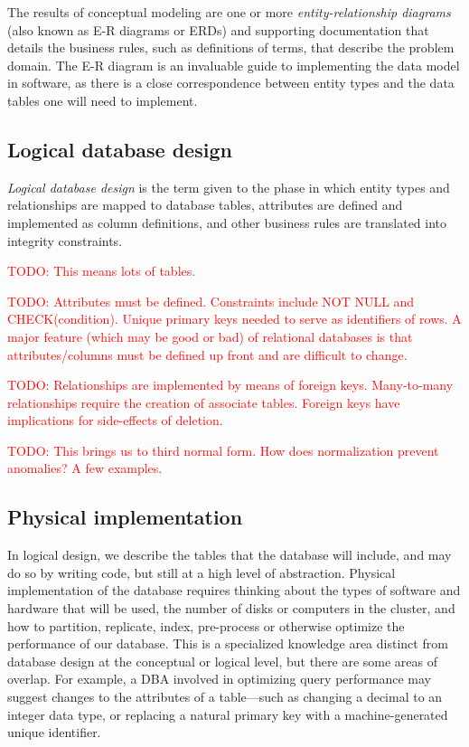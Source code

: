 \documentclass[11pt]{book}
\newcommand{\term}[1]{\emph{#1}} %
\newcommand{\todo}[1]{\textcolor{red}{TODO: #1}} %
\begin{document}
The results of conceptual modeling are one or more \term{entity-relationship diagrams} (also known as E-R diagrams or ERDs) and supporting documentation that details the business rules, such as definitions of terms, that describe the problem domain.  The E-R diagram is an invaluable guide to implementing the data model in software, as there is a close correspondence between entity types and the data tables one will need to implement.

\subsection{Logical database design}

\term{Logical database design} is the term given to the phase in which entity types and relationships are mapped to database tables, attributes are defined and implemented as column definitions, and other business rules are translated into integrity constraints.

\todo{ This means lots of tables. }

\todo{ Attributes must be defined.  Constraints include NOT NULL and CHECK(condition).  Unique primary keys needed to serve as identifiers of rows. A major feature (which may be good or bad) of relational databases is that attributes/columns must be defined up front and are difficult to change.}

\todo{ Relationships are implemented by means of foreign keys.  Many-to-many relationships require the creation of associate tables.  Foreign keys have implications for side-effects of deletion. }

\todo{ This brings us to third normal form.  How does normalization prevent anomalies?  A few examples. }

\subsection{Physical implementation}

In logical design, we describe the tables that the database will include, and may do so by writing code, but still at a high level of abstraction.  Physical implementation of the database requires thinking about the types of software and hardware that will be used, the number of disks or computers in the cluster, and how to partition, replicate, index, pre-process or otherwise optimize the performance of our database.  This is a specialized knowledge area distinct from database design at the conceptual or logical level, but there are some areas of overlap.  For example, a DBA involved in optimizing query performance may suggest changes to the attributes of a table---such as changing a decimal to an integer data type, or replacing a natural primary key with a machine-generated unique identifier.
\end{document}
